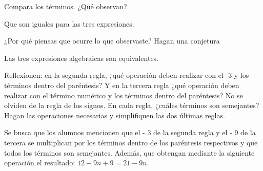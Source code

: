 \begin{parts}
    Compara los términos. ¿Qué observan?

    \begin{solutionbox}{4em}
        Que son iguales para las tres expresiones.
    \end{solutionbox}

    ¿Por qué piensas que ocurre lo que observaste? Hagan una conjetura

    \begin{solutionbox}{4em}
        Las tres expresiones algebraicas son equivalentes.
    \end{solutionbox}


    Reflexionen: en la segunda regla, ¿qué operación deben realizar con el -3 y los
    términos dentro del paréntesis? Y en la tercera regla ¿qué operación deben realizar con el término numérico y los términos dentro del paréntesis? No se olviden
    de la regla de los signos. En cada regla, ¿cuáles términos son semejantes? Hagan
    las operaciones necesarias y simplifiquen las dos últimas reglas.

    \begin{solutionbox}{6em}
        Se busca que los alumnos mencionen que el - 3 de la segunda regla y el - 9
        de la tercera se multiplican por los términos dentro de los paréntesis respectivos y que todos los términos son semejantes. Además, que obtengan mediante
        la siguiente operación el resultado: $12 - 9n + 9 = 21 - 9n$.
    \end{solutionbox}


\end{parts}
